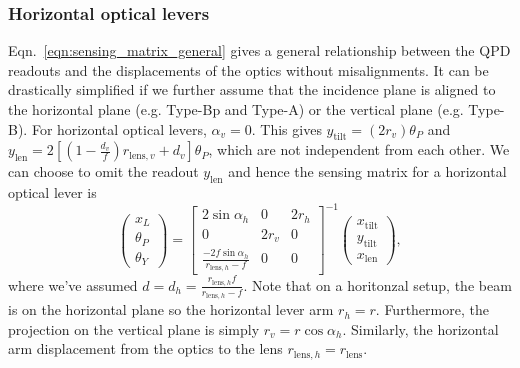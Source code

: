 \subsubsection{Horizontal optical levers \label{sec:horizontal_optical_levers}}
Eqn.~\eqref{eqn:sensing_matrix_general} gives a general relationship between the QPD readouts and the displacements of the optics without misalignments.
It can be drastically simplified if we further assume that the incidence plane is aligned to the horizontal plane (e.g. Type-Bp and Type-A) or the vertical plane (e.g. Type-B). 
For horizontal optical levers, $\alpha_v=0$.
This gives $y_\mathrm{tilt}=\left(2r_v\right)\theta_P$ and $y_\mathrm{len}=2\left[\left(1-\frac{d_v}{f}\right)r_{\mathrm{lens},v}+d_v\right]\theta_P$, which are not independent from each other.
We can choose to omit the readout $y_\mathrm{len}$ and hence the sensing matrix for a horizontal optical lever is
\begin{equation}
	\begin{pmatrix}
		x_L\\
		\theta_P\\
		\theta_Y
	\end{pmatrix}
	=
	\begin{bmatrix}
		2\sin\alpha_h & 0 & 2r_h\\
		0 & 2r_v & 0\\
		\frac{-2f\sin\alpha_h}{r_{\mathrm{lens},h}-f} & 0 & 0
	\end{bmatrix}^{-1}
	\begin{pmatrix}
		x_\mathrm{tilt}\\
		y_\mathrm{tilt}\\
		x_\mathrm{len}
	\end{pmatrix},
	\label{eqn:sensing_matrix_horizontal}
\end{equation}
where we've assumed $d=d_h=\frac{r_{\mathrm{lens},h}f}{r_{\mathrm{lens},h}-f}$.
Note that on a horitonzal setup, the beam is on the horizontal plane so the horizontal lever arm $r_h=r$.
Furthermore, the projection on the vertical plane is simply $r_v=r\cos\alpha_h$.
Similarly, the horizontal arm displacement from the optics to the lens $r_{\mathrm{lens},h}=r_\mathrm{lens}$.


